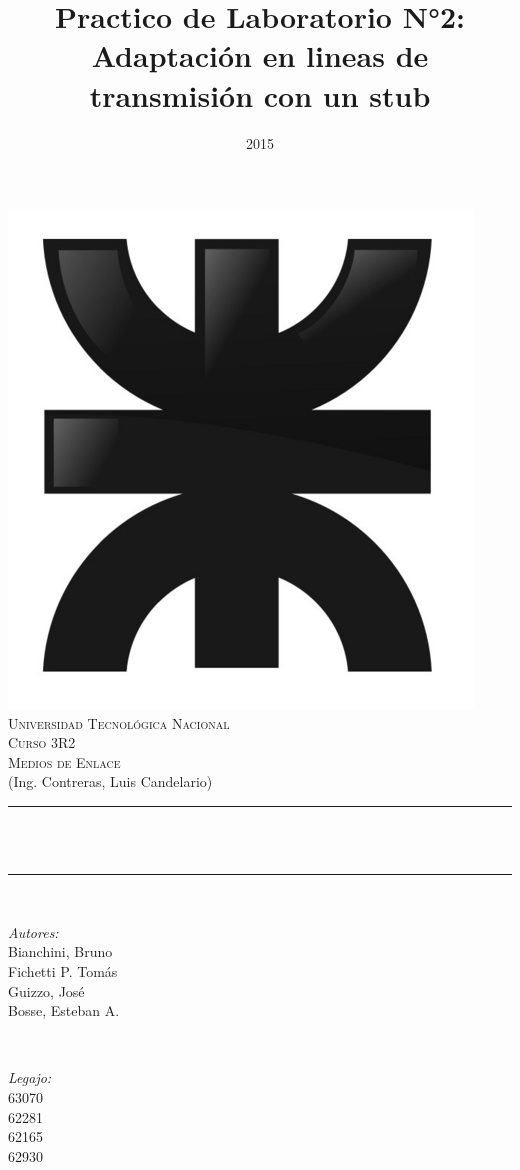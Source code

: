 \documentclass[12pt]{article}
\title{Practico de Laboratorio N°2: Adaptación en lineas de transmisión con un stub }								%
\author{}								%
\date{2015}											%
\makeatletter
\let\thetitle\@title
\makeatother
\begin{document}

\begin{titlepage}
	\centering
    \vspace*{0.5 cm}
     \includegraphics[scale = 0.8]{Logo_UTN.png}\\[1.0 cm]	%
    \textsc{\LARGE Universidad Tecnológica Nacional}\\[2.0 cm]	%
	\textsc{\Large Curso 3R2}\\[0.5 cm]				%
	\textsc{\large Medios de Enlace}\\[0 cm]				%
	\textrm{\large (Ing. Contreras, Luis Candelario)}\\[0.5 cm]
    \rule{\linewidth}{0.2 mm} \\[0.4 cm]
	{ \huge \bfseries \thetitle}\\
	\rule{\linewidth}{0.2 mm} \\[1 cm]
	
	\begin{minipage}{0.4\textwidth}
		\begin{flushleft} \large
			\emph{Autores:}\\
			Bianchini, Bruno\\Fichetti P. Tomás\\Guizzo, José\\Bosse, Esteban A.
			\end{flushleft}
			\end{minipage}~
			\begin{minipage}{0.4\textwidth}
			\begin{flushright} \large
			\emph{Legajo:} \\
			 63070\\62281\\62165\\62930									%
		\end{flushright}
	\end{minipage}\\[2 cm]
	

\end{titlepage}
\end{document}
